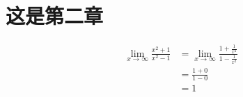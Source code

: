\section{这是第二章}

\begin{theorem}
\begin{align*}
    \lim_{x \to \infty} \frac{x^2+1}{x^2-1} 
    &= \lim_{x \to \infty} \frac{1+\frac{1}{x^2}}{1-\frac{1}{x^2}}\\
    &= \frac{1+0}{1-0}\\
    &= 1
\end{align*}
\end{theorem}